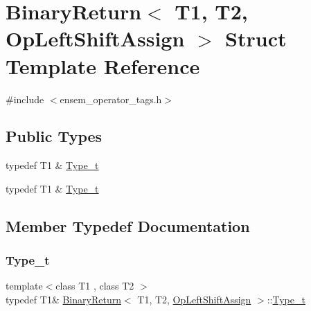 \hypertarget{structBinaryReturn_3_01T1_00_01T2_00_01OpLeftShiftAssign_01_4}{}\section{Binary\+Return$<$ T1, T2, Op\+Left\+Shift\+Assign $>$ Struct Template Reference}
\label{structBinaryReturn_3_01T1_00_01T2_00_01OpLeftShiftAssign_01_4}


{\ttfamily \#include $<$ensem\+\_\+operator\+\_\+tags.\+h$>$}

\subsection*{Public Types}
\begin{DoxyCompactItemize}
\item 
typedef T1 \& \mbox{\hyperlink{structBinaryReturn_3_01T1_00_01T2_00_01OpLeftShiftAssign_01_4_a7d79a1ecfbc2faf0748a47701eee12af}{Type\+\_\+t}}
\item 
typedef T1 \& \mbox{\hyperlink{structBinaryReturn_3_01T1_00_01T2_00_01OpLeftShiftAssign_01_4_a7d79a1ecfbc2faf0748a47701eee12af}{Type\+\_\+t}}
\end{DoxyCompactItemize}


\subsection{Member Typedef Documentation}
\mbox{\label{structBinaryReturn_3_01T1_00_01T2_00_01OpLeftShiftAssign_01_4_a7d79a1ecfbc2faf0748a47701eee12af}} 
\subsubsection{\texorpdfstring{Type\_t}{Type\_t}\hspace{0.1cm}{\footnotesize\ttfamily [1/2]}}
{\footnotesize\ttfamily template$<$class T1 , class T2 $>$ \\
typedef T1\& \mbox{\hyperlink{structBinaryReturn}{Binary\+Return}}$<$ T1, T2, \mbox{\hyperlink{structOpLeftShiftAssign}{Op\+Left\+Shift\+Assign}} $>$\+::\mbox{\hyperlink{structBinaryReturn_3_01T1_00_01T2_00_01OpLeftShiftAssign_01_4_a7d79a1ecfbc2faf0748a47701eee12af}{Type\+\_\+t}}}

